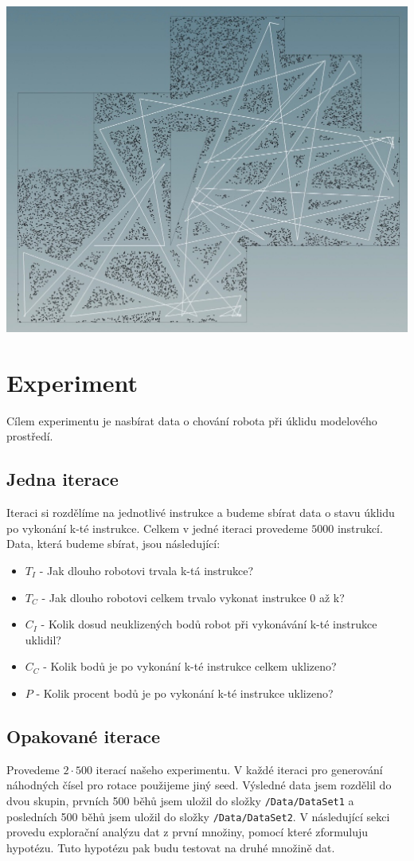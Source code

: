 \documentclass[11pt]{article}
\def\code#1{\texttt{#1}}
\begin{document}
\begin{center}
	\includegraphics[scale=0.35]{Images/CleaningPath.jpeg}
\end{center}

\section{Experiment}
Cílem experimentu je nasbírat data o chování robota při úklidu modelového prostředí.
\subsection{Jedna iterace}
Iteraci si rozdělíme na jednotlivé instrukce a budeme sbírat data o stavu úklidu po vykonání k-té instrukce. Celkem v jedné iteraci provedeme $5000$ instrukcí. Data, která budeme sbírat, jsou následující:
\begin{itemize}
	\item $T_I$ - Jak dlouho robotovi trvala k-tá instrukce?
	\item $T_C$ - Jak dlouho robotovi celkem trvalo vykonat instrukce 0 až k?
	\item $C_I$ - Kolik dosud neuklizených bodů robot při vykonávání k-té instrukce uklidil?
	\item $C_C$ - Kolik bodů je po vykonání k-té instrukce celkem uklizeno?
	\item $P$ - Kolik procent bodů je po vykonání k-té instrukce uklizeno?
\end{itemize}

\subsection{Opakované iterace}
Provedeme $2\cdot 500$ iterací našeho experimentu. V každé iteraci pro generování náhodných čísel pro rotace použijeme jiný seed. Výsledné data jsem rozdělil do dvou skupin, prvních 500 běhů jsem uložil do složky \code{/Data/DataSet1} a posledních 500 běhů jsem uložil do složky \code{/Data/DataSet2}. V následující sekci provedu explorační analýzu dat z první množiny, pomocí které zformuluju hypotézu. Tuto hypotézu pak budu testovat na druhé množině dat.
\end{document}
